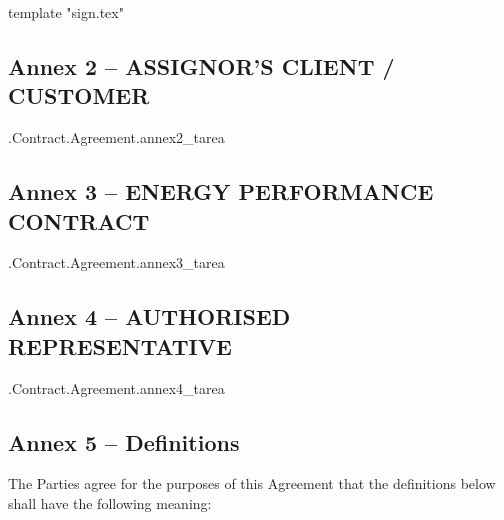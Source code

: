 \documentclass[a4paper]{article}
\begin{document}
{{template "sign.tex"}}

\subsection{Annex 2 – ASSIGNOR'S CLIENT / CUSTOMER}

\iffalse input forfaitingFields.annex2_tarea value="{{.Contract.Agreement.annex2_tarea}}" type="textarea" \fi {{.Contract.Agreement.annex2_tarea}}

\pagebreak

\subsection{Annex 3 – ENERGY PERFORMANCE CONTRACT}

\iffalse input forfaitingFields.annex3_tarea value="{{.Contract.Agreement.annex3_tarea}}" type="textarea" \fi {{.Contract.Agreement.annex3_tarea}}

\pagebreak

\subsection{Annex 4 – AUTHORISED REPRESENTATIVE}

\iffalse input forfaitingFields.annex4_tarea value="{{.Contract.Agreement.annex4_tarea}}" type="textarea" \fi {{.Contract.Agreement.annex4_tarea}}

\pagebreak

\subsection{Annex 5 – Definitions}


\renewcommand*{\theenumi}{\roman{enumi}}

The Parties agree for the purposes of this Agreement that the
definitions below shall have the following meaning: \par
\end{document}
